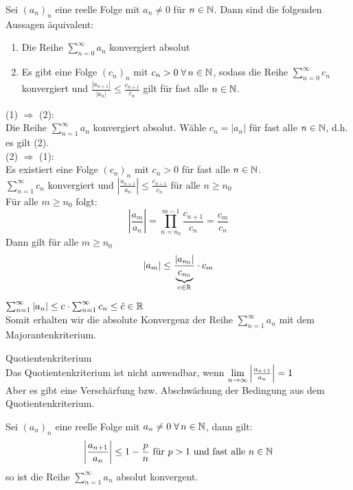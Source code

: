 \documentclass[../ana1u.tex]{subfiles}
\begin{document}
\begin{lem}
    Sei \((a_n)_n \) eine reelle Folge mit \(a_n \neq 0 \) für \(n \in \mathbb{N} \). 
    Dann sind die folgenden Aussagen äquivalent:
    \begin{enumerate}
        \item 
            Die Reihe \(\sum_{n=0}^{\infty} a_n\) konvergiert absolut
        \item
            Es gibt eine Folge \((c_n)_n \) mit \(c_n > 0 \; \forall \, n \in \mathbb{N} \), 
            sodass die Reihe \(\sum_{n=0}^{\infty} c_n \) konvergiert und
            \(\frac{|a_{n+1}|}{|a_n|} \leq \frac{c_{n+1}}{c_n} \) gilt für fast alle 
            \(n \in \mathbb{N} \).
    \end{enumerate}
\end{lem}
\begin{bew}
    (1) \(\Rightarrow \) (2): \\
    Die Reihe \(\sum_{n=1}^{\infty} a_n \) konvergiert absolut. Wähle \(c_n = |a_n| \) 
    für fast alle \(n \in \mathbb{N} \), d.h. es gilt (2). \\
    (2) \(\Rightarrow \) (1): \\
    Es existiert eine Folge \((c_n)_n \) mit \(c_n > 0 \) für fast alle \(n \in \mathbb{N} \). \\
    \(\sum_{n=1}^{\infty} c_n\) konvergiert und \(\left|\frac{a_{n+1}}{a_n}\right| 
    \leq \frac{c_{n+1}}{c_n}\) für alle \(n \geq n_0 \) \\
    Für alle \(m \geq n_0 \) folgt:
    \[\left|\frac{a_{m}}{a_n}\right| = \prod_{n=n_0}^{m-1} \frac{c_{n+1}}{c_n} 
    = \frac{c_{m}}{c_n} \]
    Dann gilt für alle \(m \geq n_0 \)
    \[|a_m| \leq \frac{|a_{n_0}|}{\underbrace{c_{n_0}}_{c \in \mathbb{R}}} \cdot c_m \]
\end{bew}
\begin{bem}
    \(\sum_{n=1}^{\infty} |a_n| \leq c \cdot \sum_{n=1}^{\infty} c_n \leq \tilde{c} \in \mathbb{R} \) \\
    Somit erhalten wir die absolute Konvergenz der Reihe \(\sum_{n=1}^{\infty} a_n\) 
    mit dem Majorantenkriterium.
\end{bem}
\begin{bem}
    Quotientenkriterium \\
    Das Quotientenkriterium ist nicht anwendbar, wenn 
    \(\lim\limits_{n\rightarrow\infty} \left|\frac{a_{n+1}}{a_n}\right| = 1 \) \\
    Aber es gibt eine Verschärfung bzw. Abschwächung der Bedingung aus dem 
    Quotientenkriterium.
\end{bem}
\begin{kor}
    Sei \((a_n)_n \) eine reelle Folge mit \(a_n \neq 0 \; \forall \, n \in \mathbb{N} \), dann gilt:
    \[\left|\frac{a_{n+1}}{a_n}\right| \leq 1 - \frac{p}{n} 
    \text{ für } p > 1 \text{ und fast alle } n \in \mathbb{N} \]
    so ist die Reihe \(\sum_{n=1}^{\infty} a_n \) absolut konvergent.
\end{kor}
\end{document}
